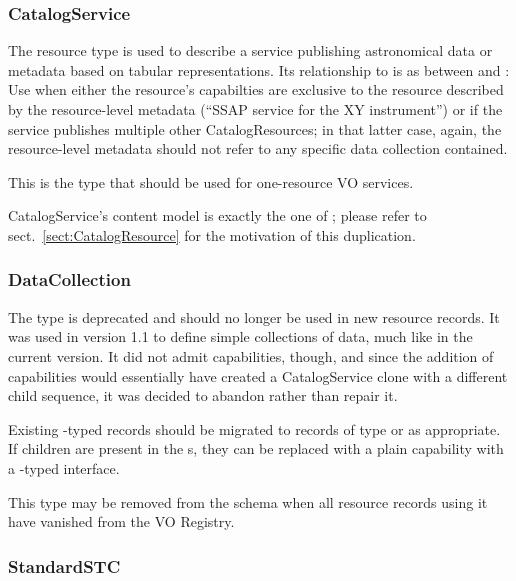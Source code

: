 \documentclass[11pt,a4paper]{ivoa}
\begin{document}


\subsubsection{CatalogService}

The  resource type is used to describe a
service publishing astronomical data or metadata based on tabular
representations.  Its relationship to 
is as between 
and : Use  when either
the resource's capabilties are exclusive to the resource described by
the resource-level metadata (``SSAP service for the XY instrument'') or
if the service publishes multiple other CatalogResources; in that latter
case, again, the resource-level metadata should not refer to any
specific data collection contained.

This is the type that should be used for one-resource VO
services.

CatalogService's content model is exactly the one of
; please refer to sect.~\ref{sect:CatalogResource}
for the motivation of this duplication.

\subsubsection{DataCollection}
\label{sect:datacollection}

The  type is deprecated and should no longer be
used in new resource records.  It was used in version 1.1 to define
simple collections of data, much like  in the
current version.  It did not admit capabilities, though, and since the
addition of capabilities would essentially have created a CatalogService
clone with a different child sequence, it was decided to abandon rather
than repair it.

Existing -typed
records should be migrated to records of type  or
 as appropriate.  If 
children are present in the
\/s,
they can be replaced with a plain capability with a
-typed interface.

This type may be removed from the schema when all resource records using
it have vanished from the VO Registry.

\subsubsection{StandardSTC}
\end{document}
